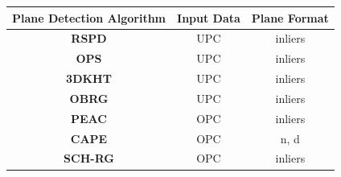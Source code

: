 \documentclass[main.tex]{subfiles}
\begin{document}
\begin{table}[H]
    \centering
    \begin{tabular}{c|c|c}
        \textbf{Plane Detection Algorithm}                               & \textbf{Input Data} & \textbf{Plane Format}\\ \hline %
        \textbf{RSPD} \cite{Araújo_Oliveira_2020}                        & UPC                 & inliers              \\  %
        \textbf{OPS} \cite{Sun_Mordohai_2019}                            & UPC                 & inliers              \\  %
        \textbf{3DKHT} \cite{Limberger_Oliveira_2015}                    & UPC                 & inliers              \\  %
        \textbf{OBRG} \cite{Vo_Truong-Hong_Laefer_Bertolotto_2015}       & UPC                 & inliers              \\  %
        \textbf{PEAC} \cite{Feng_Taguchi_Kamat_2014}                     & OPC                 & inliers              \\  %
        \textbf{CAPE} \cite{Proença_Gao_2018}                            & OPC                 & n, d            \\  %
        \textbf{SCH-RG} \cite{Mols_Li_Hanebeck_2020}                     & OPC                 & inliers              \\  %

\end{tabular}
\end{table}
\end{document}
